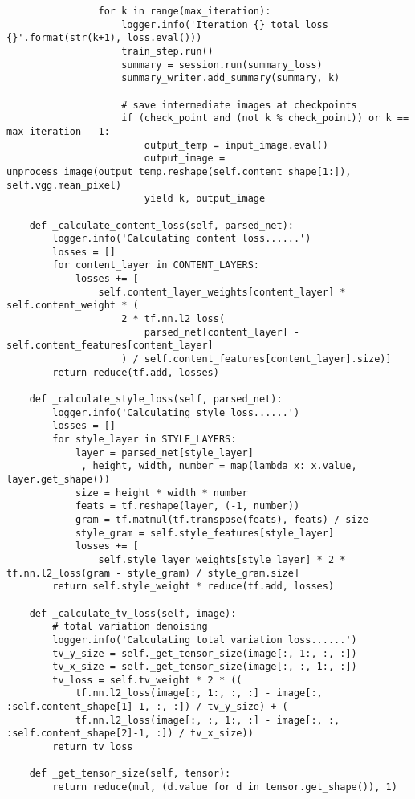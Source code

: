 \begin{spacing}{1.2}
\begin{lstlisting}
                for k in range(max_iteration):
                    logger.info('Iteration {} total loss {}'.format(str(k+1), loss.eval()))
                    train_step.run()
                    summary = session.run(summary_loss)
                    summary_writer.add_summary(summary, k)

                    # save intermediate images at checkpoints
                    if (check_point and (not k % check_point)) or k == max_iteration - 1:
                        output_temp = input_image.eval()
                        output_image = unprocess_image(output_temp.reshape(self.content_shape[1:]), self.vgg.mean_pixel)
                        yield k, output_image

    def _calculate_content_loss(self, parsed_net):
        logger.info('Calculating content loss......')
        losses = []
        for content_layer in CONTENT_LAYERS:
            losses += [
                self.content_layer_weights[content_layer] * self.content_weight * (
                    2 * tf.nn.l2_loss(
                        parsed_net[content_layer] - self.content_features[content_layer]
                    ) / self.content_features[content_layer].size)]
        return reduce(tf.add, losses)

    def _calculate_style_loss(self, parsed_net):
        logger.info('Calculating style loss......')
        losses = []
        for style_layer in STYLE_LAYERS:
            layer = parsed_net[style_layer]
            _, height, width, number = map(lambda x: x.value, layer.get_shape())
            size = height * width * number
            feats = tf.reshape(layer, (-1, number))
            gram = tf.matmul(tf.transpose(feats), feats) / size
            style_gram = self.style_features[style_layer]
            losses += [
                self.style_layer_weights[style_layer] * 2 * tf.nn.l2_loss(gram - style_gram) / style_gram.size]
        return self.style_weight * reduce(tf.add, losses)

    def _calculate_tv_loss(self, image):
        # total variation denoising
        logger.info('Calculating total variation loss......')
        tv_y_size = self._get_tensor_size(image[:, 1:, :, :])
        tv_x_size = self._get_tensor_size(image[:, :, 1:, :])
        tv_loss = self.tv_weight * 2 * ((
            tf.nn.l2_loss(image[:, 1:, :, :] - image[:, :self.content_shape[1]-1, :, :]) / tv_y_size) + (
            tf.nn.l2_loss(image[:, :, 1:, :] - image[:, :, :self.content_shape[2]-1, :]) / tv_x_size))
        return tv_loss

    def _get_tensor_size(self, tensor):
        return reduce(mul, (d.value for d in tensor.get_shape()), 1)

\end{lstlisting}
\end{spacing}


